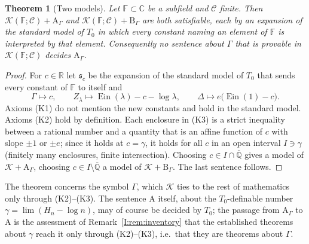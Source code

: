 \documentclass[11pt,a4paper]{article}
\newcommand{\R}{\mathbb R}
\newcommand{\C}{\mathbb C}
\newcommand{\Qbar}{\overline{\mathbb Q}}
\newcommand{\Ein}{\operatorname{Ein}}
\newcommand{\Fld}{\mathbb F}
\newcommand{\Th}{\mathcal K}
\newcommand{\shear}{\mathfrak s}
\newtheorem{theorem}{Theorem}[section]
\theoremstyle{definition}
\theoremstyle{remark}
\numberwithin{equation}{section}
\begin{document}
\begin{theorem}[Two models]\label{I:thm:two-models}
Let $\Fld\subset\C$ be a subfield and $\mathcal C$ finite. Then
$\Th(\Fld;\mathcal C)+\mathrm A_\Gamma$ and $\Th(\Fld;\mathcal C)+\mathrm B_\Gamma$ are
both satisfiable, each by an expansion of the standard model of $T_0$ in which every
constant naming an element of $\Fld$ is interpreted by that element. Consequently no
sentence about $\Gamma$ that is provable in $\Th(\Fld;\mathcal C)$ decides
$\mathrm A_\Gamma$.
\end{theorem}
\begin{proof}
For $c\in\R$ let $\shear_c$ be the expansion of the standard model of $T_0$ that sends
every constant of $\Fld$ to itself and
\[
 \Gamma\mapsto c,\qquad Z_\lambda\mapsto\Ein(\lambda)-c-\log\lambda,\qquad
 \Delta\mapsto e\bigl(\Ein(1)-c\bigr).
\]
Axioms (K1) do not mention the new constants and hold in the standard model. Axioms (K2)
hold by definition. Each enclosure in (K3) is a strict inequality between a rational
number and a quantity that is an affine function of $c$ with slope $\pm1$ or $\pm e$;
since it holds at $c=\gamma$, it holds for all $c$ in an open interval $I\ni\gamma$
(finitely many enclosures, finite intersection). Choosing $c\in I\cap\Qbar$ gives a model
of $\Th+\mathrm A_\Gamma$, choosing $c\in I\setminus\Qbar$ a model of
$\Th+\mathrm B_\Gamma$. The last sentence follows.
\end{proof}

The theorem concerns the symbol $\Gamma$, which $\Th$ ties to the rest of mathematics only
through (K2)--(K3). The sentence $\mathrm A$ itself, about the $T_0$-definable number
$\gamma=\lim(H_n-\log n)$, may of course be decided by $T_0$; the passage from
$\mathrm A_\Gamma$ to $\mathrm A$ is the assessment of Remark~\ref{I:rem:inventory} that the
established theorems about $\gamma$ reach it only through (K2)--(K3), i.e.\ that they are
theorems about $\Gamma$.
\end{document}
